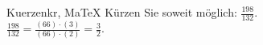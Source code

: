 \begin{MAufgabe}{Kuerzen}{kr, MaTeX}
K\"urzen Sie soweit m\"oglich: $\frac{198}{132}$.\\ 
\ifLsg\MLoesung
\quad $\frac{198}{132}=\frac{(66)\cdot(3)}{(66)\cdot(2)}=\frac{3}{2}$.\else\relax\fi
 \end{MAufgabe}